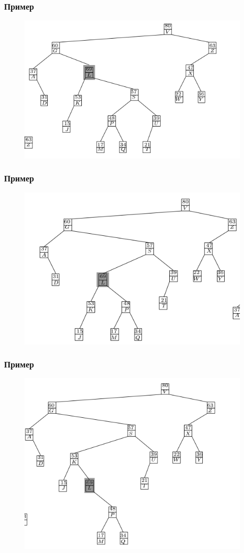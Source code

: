 \documentclass[hyperref={unicode=true}]{beamer}
\begin{document}
\frame
{
  \frametitle{Пример}
  \begin{figure}[h!]
  \centerline{\includegraphics[scale=0.5]{ins2.png}}
  \end{figure}
}

\frame
{
  \frametitle{Пример}
  \begin{figure}[h!]
  \centerline{\includegraphics[scale=0.5]{ins3.png}}
  \end{figure}
}

\frame
{
  \frametitle{Пример}
  \begin{figure}[h!]
  \centerline{\includegraphics[scale=0.5]{ins4.png}}
  \end{figure}
}
\end{document}
